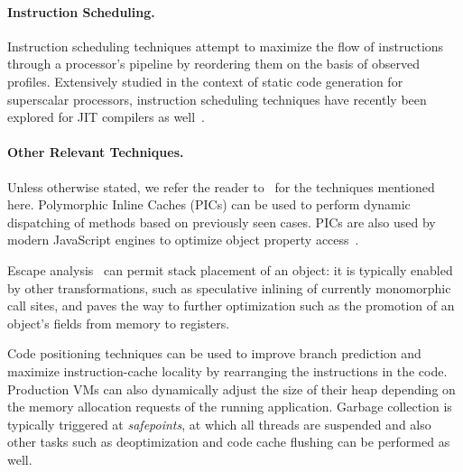 \paragraph*{Instruction Scheduling.} Instruction scheduling techniques attempt to maximize the flow of instructions through a processor's pipeline by reordering them on the basis of observed profiles. Extensively studied in the context of static code generation for superscalar processors, instruction scheduling techniques have recently been explored for JIT compilers as well~\cite{Arnold05, Touati14}.

\paragraph*{Other Relevant Techniques.} Unless otherwise stated, we refer the reader to~\cite{Arnold05} for the techniques mentioned here. Polymorphic Inline Caches (PICs) can be used to perform dynamic dispatching of methods based on previously seen cases. PICs are also used by modern JavaScript engines to optimize object property access~\cite{ChevalierBoisvert16}.

Escape analysis~\cite{Choi99} can permit stack placement of an object: it is typically enabled by other transformations, such as speculative inlining of currently monomorphic call sites, and paves the way to further optimization such as the promotion of an object's fields from memory to registers.

Code positioning techniques can be used to improve branch prediction and maximize instruction-cache locality by rearranging the instructions in the code. Production VMs can also dynamically adjust the size of their heap depending on the memory allocation requests of the running application. Garbage collection is typically triggered at {\em safepoints}, at which all threads are suspended and also other tasks such as deoptimization and code cache flushing can be performed as well.

